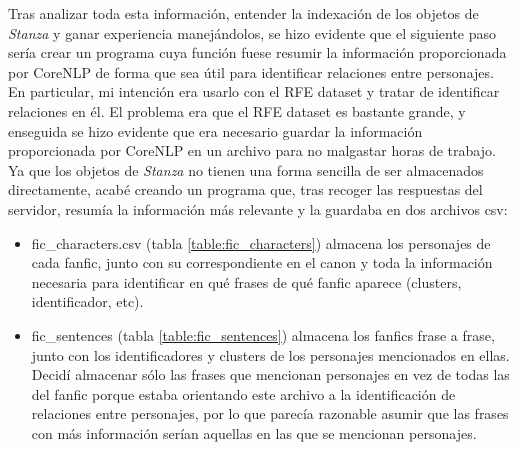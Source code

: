\documentclass{pre-tfg}
\begin{document}
Tras analizar toda esta información, entender la indexación de los objetos de \textit{Stanza} y ganar experiencia manejándolos, se hizo evidente que el siguiente paso sería crear un programa cuya función fuese resumir la información proporcionada por CoreNLP de forma que sea útil para identificar relaciones entre personajes. En particular, mi intención era usarlo con el RFE dataset y tratar de identificar relaciones en él.
El problema era que el RFE dataset es bastante grande, y enseguida se hizo evidente que era necesario guardar la información proporcionada por CoreNLP en un archivo para no malgastar horas de trabajo. Ya que los objetos de \textit{Stanza} no tienen una forma sencilla de ser almacenados directamente, acabé creando un programa que, tras recoger las respuestas del servidor, resumía la información más relevante y la guardaba en dos archivos csv: 

\begin{itemize}
	\item fic\_characters.csv (tabla \ref{table:fic_characters}) almacena los personajes de cada fanfic, junto con su correspondiente en el canon y toda la información necesaria para identificar en qué frases de qué fanfic aparece (clusters, identificador, etc).
	\item fic\_sentences (tabla \ref{table:fic_sentences}) almacena los fanfics frase a frase, junto con los identificadores y clusters de los personajes mencionados en ellas. Decidí almacenar sólo las frases que mencionan personajes en vez de todas las del fanfic porque estaba orientando este archivo a la identificación de relaciones entre personajes, por lo que parecía razonable asumir que las frases con más información serían aquellas en las que se mencionan personajes.
\end{itemize}

\end{document}
